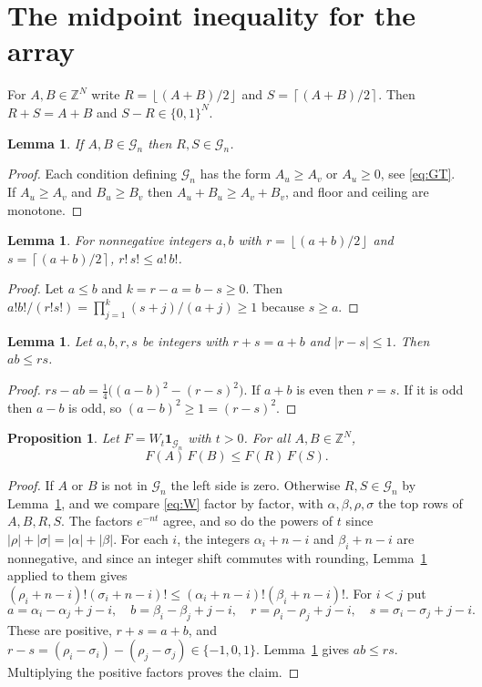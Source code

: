 \documentclass[11pt]{amsart}
\newtheorem{lemma}[theorem]{Lemma}
\newtheorem{proposition}[theorem]{Proposition}
\theoremstyle{remark}
\numberwithin{equation}{section}
\newcommand{\1}{\mathbf 1}
\newcommand{\Z}{\mathbb Z}
\newcommand{\fl}[1]{\left\lfloor #1\right\rfloor}
\newcommand{\cl}[1]{\left\lceil #1\right\rceil}
\begin{document}
\section{The midpoint inequality for the array}\label{sec:midpoint}

For $A,B\in\Z^N$ write $R=\fl{(A+B)/2}$ and $S=\cl{(A+B)/2}$. Then $R+S=A+B$ and $S-R\in\{0,1\}^N$.

\begin{lemma}\label{lem:support}
If $A,B\in\mathcal G_n$ then $R,S\in\mathcal G_n$.
\end{lemma}

\begin{proof}
Each condition defining $\mathcal G_n$ has the form $A_u\ge A_v$ or $A_u\ge0$, see \eqref{eq:GT}. If $A_u\ge A_v$ and $B_u\ge B_v$ then $A_u+B_u\ge A_v+B_v$, and floor and ceiling are monotone.
\end{proof}

\begin{lemma}\label{lem:fact}
For nonnegative integers $a,b$ with $r=\fl{(a+b)/2}$ and $s=\cl{(a+b)/2}$, $r!\,s!\le a!\,b!$.
\end{lemma}

\begin{proof}
Let $a\le b$ and $k=r-a=b-s\ge0$. Then $a!b!/(r!s!)=\prod_{j=1}^k(s+j)/(a+j)\ge1$ because $s\ge a$.
\end{proof}

\begin{lemma}\label{lem:diff}
Let $a,b,r,s$ be integers with $r+s=a+b$ and $|r-s|\le1$. Then $ab\le rs$.
\end{lemma}

\begin{proof}
$rs-ab=\frac14\bigl((a-b)^2-(r-s)^2\bigr)$. If $a+b$ is even then $r=s$. If it is odd then $a-b$ is odd, so $(a-b)^2\ge1=(r-s)^2$.
\end{proof}

\begin{proposition}\label{prop:array}
Let $F=W_t\1_{\mathcal G_n}$ with $t>0$. For all $A,B\in\Z^N$,
\[
F(A)\,F(B)\le F(R)\,F(S).
\]
\end{proposition}

\begin{proof}
If $A$ or $B$ is not in $\mathcal G_n$ the left side is zero. Otherwise $R,S\in\mathcal G_n$ by Lemma~\ref{lem:support}, and we compare \eqref{eq:W} factor by factor, with $\alpha,\beta,\rho,\sigma$ the top rows of $A,B,R,S$. The factors $e^{-nt}$ agree, and so do the powers of $t$ since $|\rho|+|\sigma|=|\alpha|+|\beta|$. For each $i$, the integers $\alpha_i+n-i$ and $\beta_i+n-i$ are nonnegative, and since an integer shift commutes with rounding, Lemma~\ref{lem:fact} applied to them gives $(\rho_i+n-i)!(\sigma_i+n-i)!\le(\alpha_i+n-i)!(\beta_i+n-i)!$. For $i<j$ put
\[
a=\alpha_i-\alpha_j+j-i,\quad b=\beta_i-\beta_j+j-i,\quad r=\rho_i-\rho_j+j-i,\quad s=\sigma_i-\sigma_j+j-i.
\]
These are positive, $r+s=a+b$, and $r-s=(\rho_i-\sigma_i)-(\rho_j-\sigma_j)\in\{-1,0,1\}$. Lemma~\ref{lem:diff} gives $ab\le rs$. Multiplying the positive factors proves the claim.
\end{proof}
\end{document}
